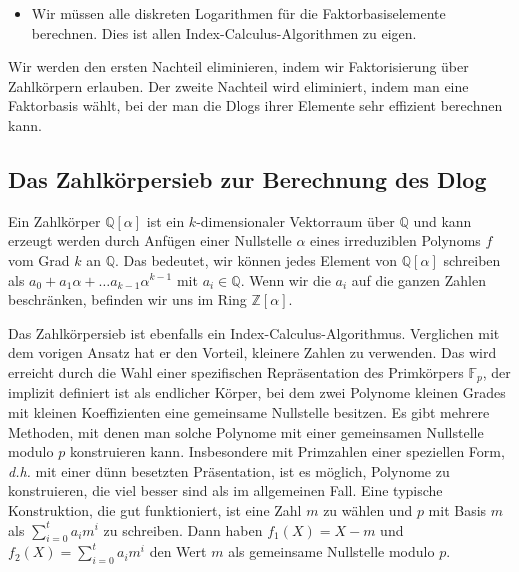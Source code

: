 \begin{refsegment}
\begin{itemize}
\DIFdelend \item Wir müssen alle diskreten Logarithmen für die Faktorbasiselemente berechnen. Dies ist allen Index-Calculus-Algorithmen zu eigen.
\end{itemize}

Wir werden den ersten Nachteil eliminieren, indem wir Faktorisierung über Zahlkörpern erlauben.
Der zweite Nachteil wird eliminiert, indem man eine Faktorbasis wählt, bei der man die Dlogs ihrer Elemente sehr effizient berechnen kann.



\subsection[Das Zahlkörpersieb zur Berechnung des Dlog]{Das Zahlkörpersieb zur Berechnung des Dlog\footnotemark}
\label{nfs-dlog}

Ein Zahlkörper $\mathbb{Q}[\alpha]$ ist ein $k$-dimensionaler Vektorraum über $\mathbb{Q}$ und kann erzeugt werden durch Anfügen einer Nullstelle $\alpha$ eines irreduziblen Polynoms $f$ vom Grad $k$ an $\mathbb{Q}$. Das bedeutet, wir können jedes Element von $\mathbb{Q}[\alpha]$ schreiben als $a_0+a_1\alpha + \ldots a_{k-1}\alpha^{k-1}$ mit $a_i \in \mathbb{Q}$. Wenn wir die $a_i$ auf die ganzen Zahlen beschränken, befinden wir uns im Ring $\mathbb{Z}[\alpha]$.

Das Zahlkörpersieb ist ebenfalls ein Index-Calculus-Algorithmus. Verglichen
mit dem vorigen Ansatz hat er den Vorteil, kleinere Zahlen zu verwenden.
Das wird erreicht durch die Wahl einer spezifischen Repräsentation des
Primkörpers $\mathbb{F}_p$, der implizit definiert ist als endlicher Körper, bei
dem zwei Polynome kleinen Grades mit kleinen Koeffizienten eine gemeinsame
Nullstelle besitzen. Es gibt mehrere Methoden, mit denen man solche Polynome
mit einer gemeinsamen Nullstelle modulo $p$ konstruieren kann. Insbesondere
mit Primzahlen einer speziellen Form, {\it d.h.}\/ mit einer dünn besetzten
Präsentation, ist es möglich, Polynome zu konstruieren, die viel besser sind als im allgemeinen Fall.
Eine typische Konstruktion, die gut funktioniert, ist eine Zahl $m$ zu wählen und
$p$ mit Basis $m$ als $\sum_{i=0}^{t}a_im^i$ zu schreiben. Dann haben $f_1(X)=X-m$
und $f_2(X)=\sum_{i=0}^{t}a_im^i$ den Wert $m$ als gemeinsame Nullstelle modulo $p$.


\end{refsegment}
